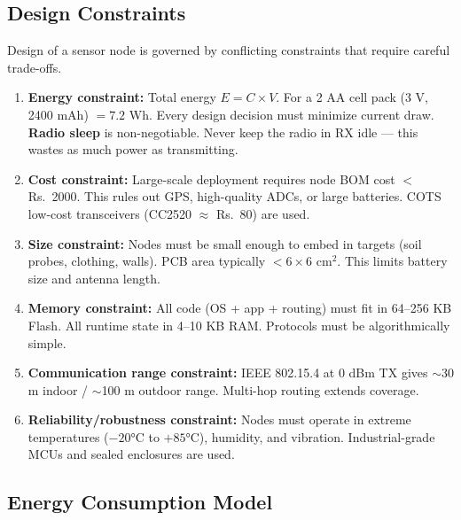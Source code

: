 \documentclass[12pt,a4paper]{article}
\begin{document}
\subsection{Design Constraints}

Design of a sensor node is governed by conflicting constraints that require careful trade-offs.

\begin{tcolorbox}[examplebox, title={\textbf{WSN Node Design Constraints}}]
\begin{enumerate}[leftmargin=*, itemsep=5pt]
  \item \textbf{Energy constraint:} Total energy $E = C \times V$. For a 2 AA cell pack (3 V, 2400 mAh) $= 7.2$ Wh. Every design decision must minimize current draw. \textbf{Radio sleep} is non-negotiable. Never keep the radio in RX idle --- this wastes as much power as transmitting.

  \item \textbf{Cost constraint:} Large-scale deployment requires node BOM cost $< $ Rs.~2000. This rules out GPS, high-quality ADCs, or large batteries. COTS low-cost transceivers (CC2520 $\approx$ Rs.~80) are used.

  \item \textbf{Size constraint:} Nodes must be small enough to embed in targets (soil probes, clothing, walls). PCB area typically $< 6 \times 6$ cm$^2$. This limits battery size and antenna length.

  \item \textbf{Memory constraint:} All code (OS + app + routing) must fit in 64--256 KB Flash. All runtime state in 4--10 KB RAM. Protocols must be algorithmically simple.

  \item \textbf{Communication range constraint:} IEEE 802.15.4 at 0 dBm TX gives $\sim$30 m indoor / $\sim$100 m outdoor range. Multi-hop routing extends coverage.

  \item \textbf{Reliability/robustness constraint:} Nodes must operate in extreme temperatures ($-20$°C to $+85$°C), humidity, and vibration. Industrial-grade MCUs and sealed enclosures are used.
\end{enumerate}
\end{tcolorbox}

\subsection{Energy Consumption Model}
\end{document}
